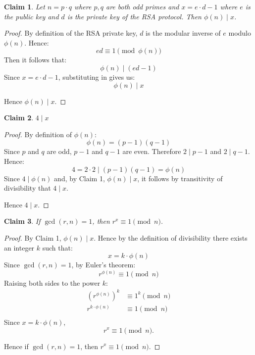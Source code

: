 \documentclass{article}
\newtheorem{claim}{Claim}
\begin{document}
\begin{claim}
    Let $n = p \cdot q$ where $p, q$ are both odd primes and $x = e \cdot d - 1$ where $e$ is the public key and
    $d$ is the private key of the RSA protocol. Then $\phi(n) \mid x$.
\end{claim}

\begin{proof}
    By definition of the RSA private key, $d$ is the modular inverse of $e$ modulo $\phi(n)$. Hence:
    \[
    ed \equiv 1 \pmod{\phi(n)}
    \]
    Then it follows that:
    \[
    \phi(n) \mid (ed - 1)
    \]
    Since $x = e \cdot d - 1$, substituting in gives us:
    \[
    \phi(n) \mid x
    \]

    \medskip

    Hence $\phi(n) \mid x$.
\end{proof}

\begin{claim}
    $4 \mid x$
\end{claim}

\begin{proof}
    By definition of $\phi(n)$:
    \[
    \phi(n) = (p - 1)(q - 1)
    \]
    Since $p$ and $q$ are odd, $p - 1$ and $q - 1$ are even. Therefore $2 \mid p - 1$ and $2 \mid q - 1$. Hence:
    \[
    4 = 2 \cdot 2 \mid (p - 1)(q - 1) = \phi(n)
    \]
    Since $4 \mid \phi(n)$ and, by Claim 1, $\phi(n) \mid x$, it follows by transitivity of divisibility 
    that $4 \mid x$.

    \medskip

    Hence $4 \mid x$.
\end{proof}

\begin{claim}
    If $\gcd(r, n) = 1$, then $r^{x} \equiv 1 \pmod{n}$.
\end{claim}

\begin{proof}
    By Claim 1, $\phi(n) \mid x$. Hence by the definition of divisibility there exists an integer $k$ such that:
    \[
    x = k \cdot \phi(n)
    \]
    Since $\gcd(r, n) = 1$, by Euler's theorem:
    \[
    r^{\phi(n)} \equiv 1 \pmod{n}
    \]
    Raising both sides to the power $k$:
    \[
    \begin{aligned}
    (r^{\phi(n)})^{k} &\equiv 1^{k} \pmod{n} \\
    r^{k \cdot \phi(n)} &\equiv 1 \pmod{n} \\
    \end{aligned}
    \]
    Since $x = k \cdot \phi(n)$,
    \[
    r^{x} \equiv 1 \pmod n.
    \]

    \medskip

    Hence if $\gcd(r, n) = 1$, then $r^{x} \equiv 1 \pmod{n}$.
\end{proof}
\end{document}
